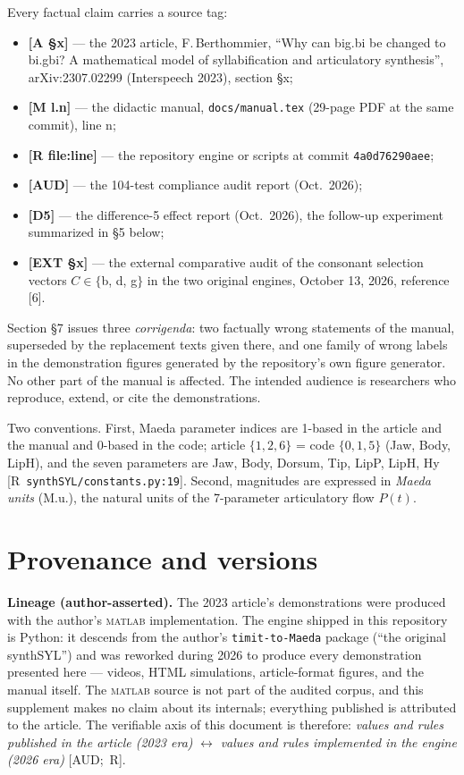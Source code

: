 \documentclass[11pt,letterpaper]{article}
\newcommand{\code}[1]{\texttt{#1}}
\newcommand{\Mua}{M.u.}
\begin{document}
Every factual claim carries a source tag:
\begin{itemize}\itemsep1pt
  \item \textbf{[A \S x]} --- the 2023 article, F.\,Berthommier,
        ``Why can big.bi be changed to bi.gbi? A mathematical model of
        syllabification and articulatory synthesis'', arXiv:2307.02299
        (Interspeech 2023), section \S x;
  \item \textbf{[M l.n]} --- the didactic manual, \code{docs/manual.tex}
        (29-page PDF at the same commit), line n;
  \item \textbf{[R file:line]} --- the repository engine or scripts at commit
        \code{4a0d76290aee};
  \item \textbf{[AUD]} --- the 104-test compliance audit report (Oct.\ 2026);
  \item \textbf{[D5]} --- the difference-5 effect report (Oct.\ 2026),
        the follow-up experiment summarized in \S5 below;
  \item \textbf{[EXT \S x]} --- the external comparative audit of the
        consonant selection vectors $C \in \{$b, d, g$\}$ in the two original
        engines, October 13, 2026, reference [6].
\end{itemize}

Section \S7 issues three \emph{corrigenda}: two factually wrong statements of
the manual, superseded by the replacement texts given there, and one family of
wrong labels in the demonstration figures generated by the repository's own
figure generator. No other part of the manual is affected.
The intended audience is researchers who reproduce, extend, or cite the
demonstrations.

Two conventions. First, Maeda parameter indices are 1-based in the article and
the manual and 0-based in the code; article $\{1,2,6\}$ = code $\{0,1,5\}$
(Jaw, Body, LipH), and the seven parameters are Jaw, Body, Dorsum, Tip, LipP,
LipH, Hy \hbox{[R \code{synthSYL/constants.py:19}]}. Second, magnitudes are
expressed in \emph{Maeda units} (\Mua), the natural units of the 7-parameter
articulatory flow $P(t)$.

\section{Provenance and versions}

\textbf{Lineage (author-asserted).} The 2023 article's demonstrations were
produced with the author's \textsc{matlab} implementation. The engine shipped
in this repository is Python: it descends from the author's
\code{timit-to-Maeda} package (``the original synthSYL'') and was reworked
during 2026 to produce every demonstration presented here --- videos, HTML
simulations, article-format figures, and the manual itself. The
\textsc{matlab} source is not part of the audited corpus, and this supplement
makes no claim about its internals; everything published is attributed to the
article. The verifiable axis of this document is therefore:
\emph{values and rules published in the article (2023 era)} $\leftrightarrow$
\emph{values and rules implemented in the engine (2026 era)}
\hbox{[AUD; R]}.
\end{document}
